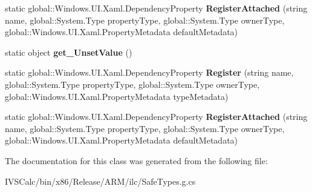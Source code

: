 \begin{DoxyCompactItemize}
static global\+::\+Windows.\+U\+I.\+Xaml.\+Dependency\+Property {\bfseries Register\+Attached} (string name, global\+::\+System.\+Type property\+Type, global\+::\+System.\+Type owner\+Type, global\+::\+Windows.\+U\+I.\+Xaml.\+Property\+Metadata default\+Metadata)
\item 
\mbox{\label{class_windows_1_1_u_i_1_1_xaml_1_1_dependency_property_a1c894733a17dba561f7ed84012ccd20f}} 
static object {\bfseries get\+\_\+\+Unset\+Value} ()
\item 
\mbox{\label{class_windows_1_1_u_i_1_1_xaml_1_1_dependency_property_afcde08990c00c5ed3c61a20868e08594}} 
static global\+::\+Windows.\+U\+I.\+Xaml.\+Dependency\+Property {\bfseries Register} (string name, global\+::\+System.\+Type property\+Type, global\+::\+System.\+Type owner\+Type, global\+::\+Windows.\+U\+I.\+Xaml.\+Property\+Metadata type\+Metadata)
\item 
\mbox{\label{class_windows_1_1_u_i_1_1_xaml_1_1_dependency_property_a6343063f73c71c10100255da1dcf03a2}} 
static global\+::\+Windows.\+U\+I.\+Xaml.\+Dependency\+Property {\bfseries Register\+Attached} (string name, global\+::\+System.\+Type property\+Type, global\+::\+System.\+Type owner\+Type, global\+::\+Windows.\+U\+I.\+Xaml.\+Property\+Metadata default\+Metadata)
\end{DoxyCompactItemize}


The documentation for this class was generated from the following file\+:\begin{DoxyCompactItemize}
\item 
I\+V\+S\+Calc/bin/x86/\+Release/\+A\+R\+M/ilc/Safe\+Types.\+g.\+cs\end{DoxyCompactItemize}
